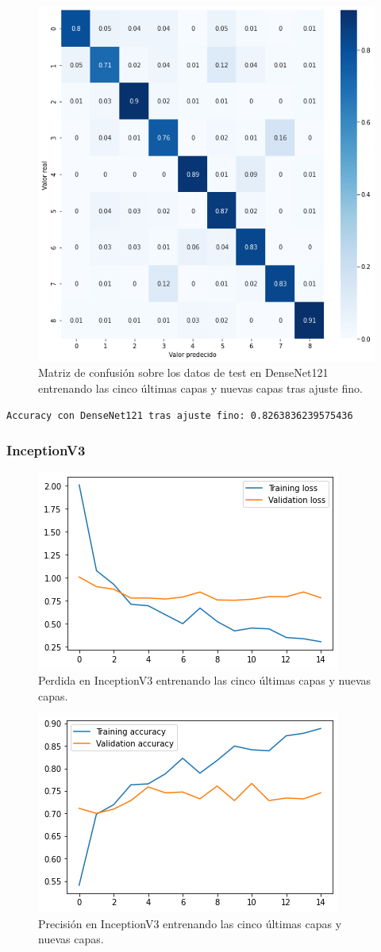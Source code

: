 \begin{figure}[H]
  \centering
  \includegraphics[width=0.5\linewidth]{Imagenes/entrenamiento_redes/5-ult/densenet_5fine_matriz.png}
  \caption{Matriz de confusión sobre los datos de test en DenseNet121 entrenando las cinco últimas capas y nuevas capas tras ajuste fino.}
\end{figure}

\begin{lstlisting}
Accuracy con DenseNet121 tras ajuste fino: 0.8263836239575436
\end{lstlisting}



\subsubsection{InceptionV3}


\begin{figure}[H]
  \centering
  \includegraphics[width=0.5\linewidth]{Imagenes/entrenamiento_redes/5-ult/inception_5ult_loss.png}
  \caption{Perdida en InceptionV3 entrenando las cinco últimas capas y nuevas capas.}
\end{figure}

\begin{figure}[H]
  \centering
  \includegraphics[width=0.5\linewidth]{Imagenes/entrenamiento_redes/5-ult/inception_5ult_acc.png}
  \caption{Precisión en InceptionV3 entrenando las cinco últimas capas y nuevas capas.}
\end{figure}


